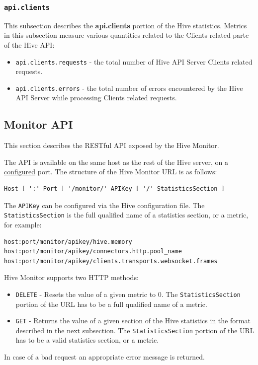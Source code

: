 \documentclass[a4paper]{article}
\begin{document}
\subsubsection{\texttt{api.clients}}
\label{sec-4-2-19}

This subsection describes the \textbf{api.clients} portion of the Hive statistics. Metrics in this subsection measure various quantities related to the Clients related parte of the Hive API:


\begin{itemize}
\item \texttt{api.clients.requests} - the total number of Hive API Server Clients related requests.
\item \texttt{api.clients.errors} - the total number of errors encountered by the Hive API Server while processing Clients related requests.
\end{itemize}
\subsection{Monitor API}
\label{sec-4-3}

This section describes the RESTful API exposed by the Hive Monitor.

\noindent
The API is available on the same host as the rest of the Hive server, on a \hyperref[sec-3-1-7]{configured} port. The structure of the Hive Monitor URL is as follows:


\begin{verbatim}
Host [ ':' Port ] '/monitor/' APIKey [ '/' StatisticsSection ]
\end{verbatim}




\noindent
The \texttt{APIKey} can be configured via the Hive configuration file. The \texttt{StatisticsSection} is the full qualified name of a statistics section, or a metric, for example:


\begin{verbatim}
host:port/monitor/apikey/hive.memory
host:port/monitor/apikey/connectors.http.pool_name
host:port/monitor/apikey/clients.transports.websocket.frames
\end{verbatim}



\noindent
Hive Monitor supports two HTTP methods:


\begin{itemize}
\item \texttt{DELETE} - Resets the value of a given metric to 0. The \texttt{StatisticsSection} portion of the URL has to be a full qualified name of a metric.
\item \texttt{GET} - Returns the value of a given section of the Hive statistics in the format described in the next subsection. The \texttt{StatisticsSection} portion of the URL has to be a valid statistics section, or a metric.
\end{itemize}
\noindent
In case of a bad request an appropriate error message is returned.
\end{document}
